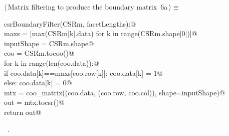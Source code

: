 \documentclass[11pt,oneside]{article}	%
\begin{document}
\begin{flushleft} \small
\begin{minipage}{\linewidth} \label{scrap13}
\protect{}$\langle\,$Matrix filtering to produce the boundary matrix\nobreak\ {\footnotesize 6a}$\,\rangle\equiv$
\vspace{-1ex}
\begin{list}{}{} \item
\mbox{}\verb@def csrBoundaryFilter(CSRm, facetLengths):@\\
\mbox{}\verb@    maxs = [max(CSRm[k].data) for k in range(CSRm.shape[0])]@\\
\mbox{}\verb@    inputShape = CSRm.shape@\\
\mbox{}\verb@    coo = CSRm.tocoo()@\\
\mbox{}\verb@    for k in range(len(coo.data)):@\\
\mbox{}\verb@        if coo.data[k]==maxs[coo.row[k]]: coo.data[k] = 1@\\
\mbox{}\verb@        else: coo.data[k] = 0@\\
\mbox{}\verb@    mtx = coo_matrix((coo.data, (coo.row, coo.col)), shape=inputShape)@\\
\mbox{}\verb@    out = mtx.tocsr()@\\
\mbox{}\verb@    return out@\\
\mbox{}\verb@@{\NWsep}
\end{list}
\vspace{-1ex}
\footnotesize\addtolength{\baselineskip}{-1ex}
\begin{list}{}{\setlength{\itemsep}{-\parsep}\setlength{\itemindent}{-\leftmargin}}
\item \NWtxtMacroRefIn\ .
\end{list}
\end{minipage}\\[4ex]
\end{flushleft}
\end{document}
